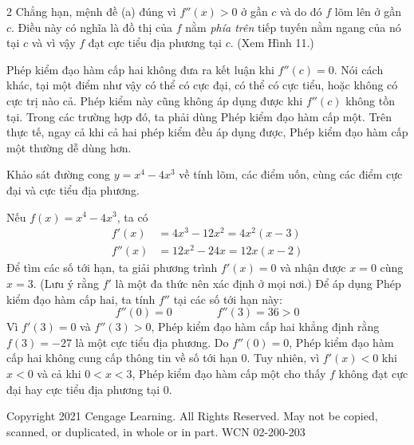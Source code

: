 \begin{paracol}{2}
Chẳng hạn, mệnh đề (a) đúng vì $f''(x) > 0$ ở gần $c$ và do đó $f$ lõm lên ở gần $c$. Điều này có nghĩa là đồ thị của $f$ nằm \emph{phía trên} tiếp tuyến nằm ngang của nó tại $c$ và vì vậy $f$ đạt cực tiểu địa phương tại $c$. (Xem Hình 11.)

\vspace{0.3em}
\quad Phép kiểm đạo hàm cấp hai không đưa ra kết luận khi $f''(c) = 0$. Nói cách khác, tại một điểm như vậy có thể có cực đại, có thể có cực tiểu, hoặc không có cực trị nào cả. Phép kiểm này cũng không áp dụng được khi $f''(c)$ không tồn tại. Trong các trường hợp đó, ta phải dùng Phép kiểm đạo hàm cấp một. Trên thực tế, ngay cả khi cả hai phép kiểm đều áp dụng được, Phép kiểm đạo hàm cấp một thường dễ dùng hơn.

\vspace{0.4em}
\quad Khảo sát đường cong $y = x^4 - 4x^3$ về tính lõm, các điểm uốn, cùng các điểm cực đại và cực tiểu địa phương.

\vspace{0.2em}
\quad Nếu $f(x) = x^4 - 4x^3$, ta có
\begin{align*}
  f'(x) &= 4x^3 - 12x^2 = 4x^2(x - 3) \\[2pt]
  f''(x) &= 12x^2 - 24x = 12x(x - 2)
\end{align*}
Để tìm các số tới hạn, ta giải phương trình $f'(x) = 0$ và nhận được $x = 0$ cùng $x = 3$. (Lưu ý rằng $f'$ là một đa thức nên xác định ở mọi nơi.) Để áp dụng Phép kiểm đạo hàm cấp hai, ta tính $f''$ tại các số tới hạn này:
\[
  f''(0) = 0 \qquad\qquad f''(3) = 36 > 0
\]
Vì $f'(3) = 0$ và $f''(3) > 0$, Phép kiểm đạo hàm cấp hai khẳng định rằng $f(3) = -27$ là một cực tiểu địa phương. Do $f''(0) = 0$, Phép kiểm đạo hàm cấp hai không cung cấp thông tin về số tới hạn 0. Tuy nhiên, vì $f'(x) < 0$ khi $x < 0$ và cả khi $0 < x < 3$, Phép kiểm đạo hàm cấp một cho thấy $f$ không đạt cực đại hay cực tiểu địa phương tại 0.

\end{paracol}

\vfill
\begin{center}
  \tiny\color{gray}
  Copyright 2021 Cengage Learning. All Rights Reserved. May not be copied, scanned, or duplicated, in whole or in part. WCN 02-200-203
\end{center}
